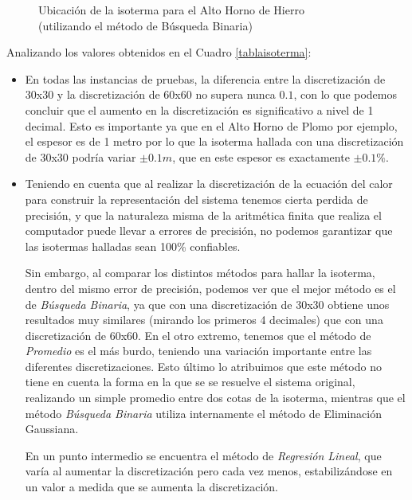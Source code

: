 \begin{figure}[H]
    \begin{center}
        \captionsetup{justification=centering}
        \caption{Ubicación de la isoterma para el Alto Horno de Hierro\\ (utilizando el método de Búsqueda Binaria)}
        \label{fig:isoterma_binaria_hierro_1}
    \end{center}
\end{figure}

Analizando los valores obtenidos en el Cuadro \ref{tablaisoterma}:
\begin{itemize}
    \item En todas las instancias de pruebas, la diferencia entre la discretización de 30x30 y la discretización de 60x60 no supera nunca $0.1$, con lo que podemos concluir que el aumento en la discretización es significativo a nivel de 1 decimal. Esto es importante ya que en el Alto Horno de Plomo por ejemplo, el espesor es de 1 metro por lo que la isoterma hallada con una discretización de 30x30 podría variar $\pm 0.1m$, que en este espesor es exactamente $\pm 0.1\%$.
    \item Teniendo en cuenta que al realizar la discretización de la ecuación del calor para construir la representación del sistema tenemos cierta perdida de precisión, y que la naturaleza misma de la aritmética finita que realiza el computador puede llevar a errores de precisión, no podemos garantizar que las isotermas halladas sean 100\% confiables.

        Sin embargo, al comparar los distintos métodos para hallar la isoterma, dentro del mismo error de precisión, podemos ver que el mejor método es el de \textit{Búsqueda Binaria}, ya que con una discretización de 30x30 obtiene unos resultados muy similares (mirando los primeros 4 decimales) que con una discretización de 60x60. En el otro extremo, tenemos que el método de \textit{Promedio} es el más burdo, teniendo una variación importante entre las diferentes discretizaciones. Esto último lo atribuimos que este método no tiene en cuenta la forma en la que se se resuelve el sistema original, realizando un simple promedio entre dos cotas de la isoterma, mientras que el método \textit{Búsqueda Binaria} utiliza internamente el método de Eliminación Gaussiana.

        En un punto intermedio se encuentra el método de \textit{Regresión Lineal}, que varía al aumentar la discretización pero cada vez menos, estabilizándose en un valor a medida que se aumenta la discretización.
\end{itemize}

